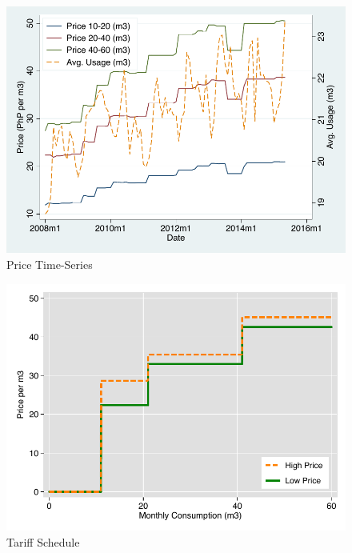 \documentclass[12pt,table]{article}
\begin{document}
\begin{figure}
\caption{Price Time-Series}\label{figure:pricetimeseries}
\begin{center}
\includegraphics[scale=1]{tables/price_series.pdf}
\end{center}
\end{figure}


\begin{figure}
\caption{Tariff Schedule}
\begin{center}
\includegraphics[scale=1]{tables/rs_prices.pdf}
\end{center}
\end{figure}
\end{document}
